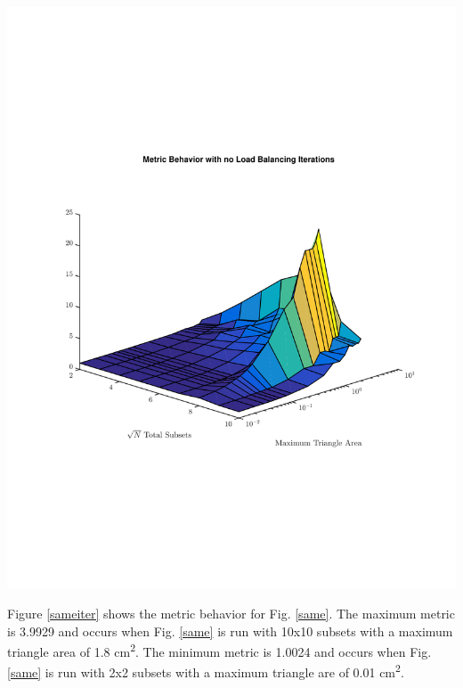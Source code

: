 \noindent\begin{minipage}{\textwidth}
\centering
\includegraphics[scale=0.78, trim = 0cm 2cm 0cm 2cm,clip]{figures/SameNoIter.pdf}
\label{samenoiter}
\end{minipage}

Figure \ref{sameiter} shows the metric behavior for Fig. \ref{same}. The maximum metric is 3.9929 and occurs when Fig. \ref{same} is run with 10x10 subsets with a maximum triangle area of 1.8 cm\textsuperscript{2}. The minimum metric is 1.0024 and occurs when Fig. \ref{same} is run with 2x2 subsets with a maximum triangle are of 0.01 cm\textsuperscript{2}.

